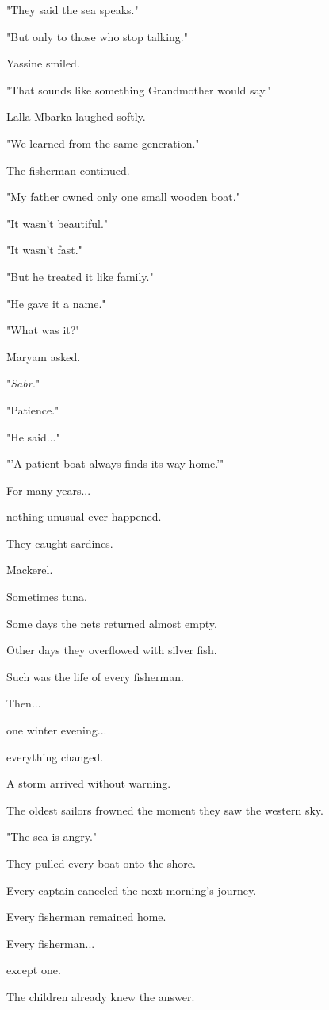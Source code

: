 \documentclass[12pt,openany]{book}
\begin{document}
"They said the sea speaks."

"But only to those who stop talking."

Yassine smiled.

"That sounds like something Grandmother would say."

Lalla Mbarka laughed softly.

"We learned from the same generation."

The fisherman continued.

"My father owned only one small wooden boat."

"It wasn't beautiful."

"It wasn't fast."

"But he treated it like family."

"He gave it a name."

"What was it?"

Maryam asked.

"\emph{Sabr.}"

"Patience."

"He said..."

"'A patient boat always finds its way home.'"

For many years...

nothing unusual ever happened.

They caught sardines.

Mackerel.

Sometimes tuna.

Some days the nets returned almost empty.

Other days they overflowed with silver fish.

Such was the life of every fisherman.

Then...

one winter evening...

everything changed.

A storm arrived without warning.

The oldest sailors frowned the moment they saw the western sky.

"The sea is angry."

They pulled every boat onto the shore.

Every captain canceled the next morning's journey.

Every fisherman remained home.

Every fisherman...

except one.

The children already knew the answer.
\end{document}
